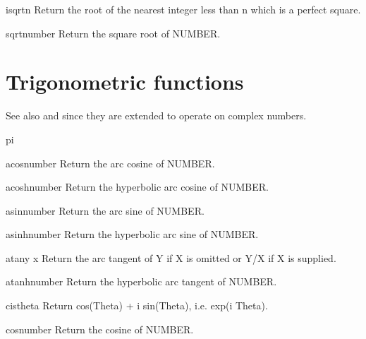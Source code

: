 \documentclass[10pt,english]{book}
\begin{document}
\begin{function}{isqrt}{n}
  Return the root of the nearest integer less than n which is a perfect
   square.
\end{function}

\begin{function}{sqrt}{number}
  Return the square root of NUMBER.
\end{function}

\section{Trigonometric functions}
\label{sec:trig-funct}

See also  and  since they are extended to operate
on complex numbers.

\begin{constant}{pi}{}
  
\end{constant}

\begin{function}{acos}{number}
  Return the arc cosine of NUMBER.
\end{function}

\begin{function}{acosh}{number}
  Return the hyperbolic arc cosine of NUMBER.
\end{function}

\begin{function}{asin}{number}
  Return the arc sine of NUMBER.
\end{function}

\begin{function}{asinh}{number}
  Return the hyperbolic arc sine of NUMBER.
\end{function}

\begin{function}{atan}{y \op x}
  Return the arc tangent of Y if X is omitted or Y/X if X is supplied.
\end{function}

\begin{function}{atanh}{number}
  Return the hyperbolic arc tangent of NUMBER.
\end{function}

\begin{function}{cis}{theta}
  Return cos(Theta) + i sin(Theta), i.e. exp(i Theta).
\end{function}

\begin{function}{cos}{number}
  Return the cosine of NUMBER.
\end{function}
\end{document}
